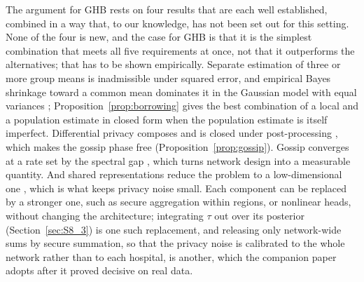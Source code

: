 \documentclass[acmsmall,screen,review]{acmart}
\theoremstyle{acmdefinition}
\begin{document}
The argument for GHB rests on four results that are each well established, combined in a way that, to our knowledge, has not been set out for this setting. None of the four is new, and the case for GHB is that it is the simplest combination that meets all five requirements at once, not that it outperforms the alternatives; that has to be shown empirically. Separate estimation of three or more group means is inadmissible under squared error, and empirical Bayes shrinkage toward a common mean dominates it in the Gaussian model with equal variances \cite{efron1973steins,stein1956inadmissibility}; Proposition~\ref{prop:borrowing} gives the best combination of a local and a population estimate in closed form when the population estimate is itself imperfect. Differential privacy composes and is closed under post-processing \cite{dwork2014algorithmic}, which makes the gossip phase free (Proposition~\ref{prop:gossip}). Gossip converges at a rate set by the spectral gap \cite{boyd2006randomized,xiao2004fast}, which turns network design into a measurable quantity. And shared representations reduce the problem to a low-dimensional one \cite{maurer2016benefit,tripuraneni2020theory}, which is what keeps privacy noise small. Each component can be replaced by a stronger one, such as secure aggregation within regions, or nonlinear heads, without changing the architecture; integrating $\tau$ out over its posterior (Section~\ref{sec:S8_3}) is one such replacement, and releasing only network-wide sums by secure summation, so that the privacy noise is calibrated to the whole network rather than to each hospital, is another, which the companion paper adopts after it proved decisive on real data.
\end{document}
